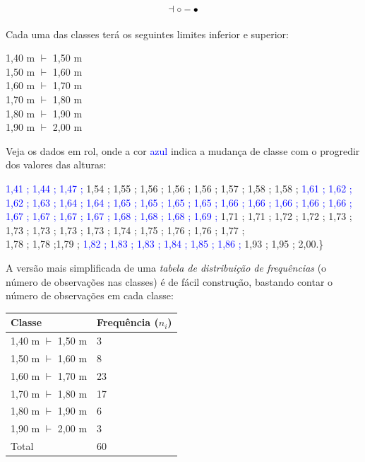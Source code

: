 \documentclass[
]{book}
\begin{document}
\[
\dashv  \\
{\circ}-{\bullet}
\]

Cada uma das classes terá os seguintes limites inferior e superior:

\hfill\break

1,40 m \(\vdash\) 1,50 m\\
1,50 m \(\vdash\) 1,60 m\\
1,60 m \(\vdash\) 1,70 m\\
1,70 m \(\vdash\) 1,80 m\\
1,80 m \(\vdash\) 1,90 m\\
1,90 m \(\vdash\) 2,00 m

\hfill\break

Veja os dados em rol, onde a cor \textcolor{blue}{azul} indica a mudança de classe com o progredir dos valores das alturas:

\hfill\break

\textcolor{blue}{1,41 ; 1,44 ; 1,47 ;}
1,54 ; 1,55 ; 1,56 ; 1,56 ; 1,56 ; 1,57 ; 1,58 ; 1,58 ;
\textcolor{blue}{1,61 ; 1,62 ; 1,62 ; 1,63 ; 1,64 ;  
1,64 ; 1,65 ; 1,65 ; 1,65 ; 1,65 ; 1,66 ; 1,66 ; 1,66 ; 1,66 ; 1,66 ; 1,67 ; 1,67 ; 1,67 ; 1,67 ; 1,68 ; 1,68 ;  
1,68 ; 1,69 ;}
1,71 ; 1,71 ; 1,72 ; 1,72 ; 1,73 ; 1,73 ; 1,73 ; 1,73 ; 1,73 ; 1,74 ; 1,75 ; 1,76 ; 1,76 ; 1,77 ;\\
1,78 ; 1,78 ;1,79 ; \textcolor{blue}{1,82 ; 1,83 ; 1,83 ; 1,84 ; 1,85 ; 1,86 ; } 1,93 ; 1,95 ; 2,00.\}

\hfill\break

A versão mais simplificada de uma \emph{tabela de distribuição de frequências} (o número de observações nas classes) é de fácil construção, bastando contar o número de observações em cada classe:

\hfill\break

\begin{longtable}[]{@{}ll@{}}
\toprule()
Classe & Frequência (\(n_{i}\)) \\
\midrule()
\endhead
1,40 m \(\vdash\) 1,50 m & 3 \\
1,50 m \(\vdash\) 1,60 m & 8 \\
1,60 m \(\vdash\) 1,70 m & 23 \\
1,70 m \(\vdash\) 1,80 m & 17 \\
1,80 m \(\vdash\) 1,90 m & 6 \\
1,90 m \(\vdash\) 2,00 m & 3 \\
Total & 60 \\
\bottomrule()
\end{longtable}
\end{document}
